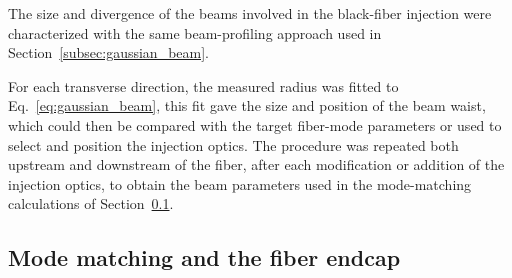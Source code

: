 The size and divergence of the beams involved in the black-fiber injection were characterized with the same beam-profiling approach used in Section~\ref{subsec:gaussian_beam}.

For each transverse direction, the measured radius was fitted to Eq.~\ref{eq:gaussian_beam}, this fit gave the size and position of the beam waist, which could then be compared with the target fiber-mode parameters or used to select and position the injection optics. The procedure was repeated both upstream and downstream of the fiber, after each modification or addition of the injection optics, to obtain the beam parameters used in the mode-matching calculations of Section~\ref{subsec:mode_matching_endcap}.

\subsection{Mode matching and the fiber endcap}
\label{subsec:mode_matching_endcap}

